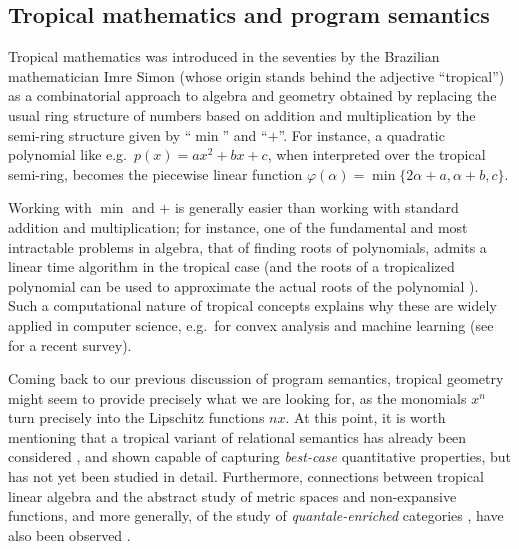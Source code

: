 \subsection{Tropical mathematics and program semantics } 


Tropical mathematics was introduced in the seventies by the Brazilian mathematician Imre Simon \cite{Simon}
 (whose origin stands behind the adjective ``tropical'') 
 as a combinatorial approach to algebra and geometry obtained by replacing the usual ring structure of numbers based on addition and multiplication by the semi-ring structure given by ``$\min$'' and ``$+$''.
%
%
For instance, a quadratic polynomial like e.g.~$p(x)=ax^{2}+bx+c$, when interpreted over the tropical semi-ring, becomes the piecewise linear function
$
\varphi(\alpha)=\min\{2\alpha + a, \alpha+b, c\}
$.

Working with $\min$ and $+$ is generally easier than working with standard addition and multiplication; for instance, one of the fundamental and most intractable problems in algebra, that of finding roots of polynomials, admits a linear time algorithm in the tropical case (and the roots of a tropicalized polynomial can be used to approximate the actual roots of the polynomial \cite{Noferini2015}). Such a computational nature of tropical concepts explains why these are widely applied in computer science, e.g.~for convex analysis and machine learning (see \cite{Maragos2021} for a recent survey).

Coming back to our previous discussion of program semantics, tropical geometry might seem to provide precisely what we are looking for, as the monomials $x^{n}$ turn precisely into the Lipschitz functions $nx$.
At this point, it is worth mentioning that a tropical variant of relational semantics has already been considered \cite{Manzo2013}, and shown capable of capturing \emph{best-case} quantitative properties, but has not yet been studied in detail. Furthermore, connections between tropical linear algebra and the abstract study of metric spaces and non-expansive functions, and more generally, of the study of \emph{quantale-enriched} categories \cite{Hofmann2014, Stubbe2014}, have also been observed \cite{Fuji}.

